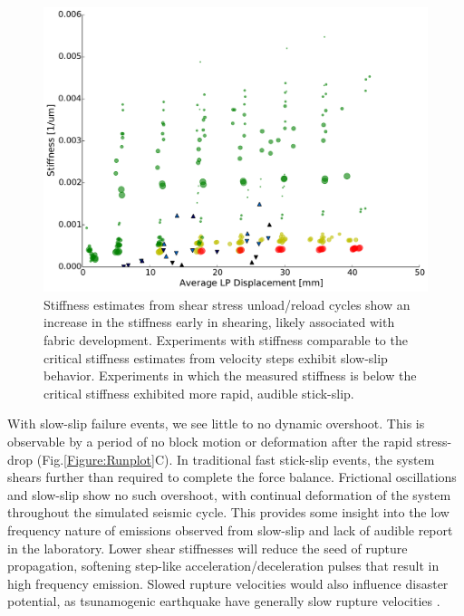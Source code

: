 \documentclass[11pt]{article}
\begin{document}
\begin{figure}
    \centering
        \includegraphics[scale=0.4]{../Figures/Fig_Stiffness_Evolution/Stiffness_Evolution.pdf}
       \caption{Stiffness estimates from shear stress unload/reload cycles show
       an increase in the stiffness early in shearing, likely associated with
       fabric development. Experiments with stiffness comparable to the critical stiffness
       estimates from velocity steps exhibit slow-slip behavior. Experiments in
       which the measured stiffness is below the critical stiffness exhibited
       more rapid, audible stick-slip.}
      \label{Figure:Stiffness Evolution}
\end{figure}

With slow-slip failure events, we see little to no dynamic overshoot. This is observable by a period of no block motion or
deformation after the rapid stress-drop (Fig.\ref{Figure:Runplot}C).  In
traditional fast stick-slip events, the system shears further than required to
complete the force balance. Frictional oscillations and slow-slip
show no such overshoot, with continual deformation of the system throughout the
simulated seismic cycle. This provides some insight into the low frequency
nature of emissions observed from slow-slip and lack of audible report in the
laboratory. Lower shear stiffnesses will reduce the seed of rupture propagation,
softening step-like acceleration/deceleration pulses that result in high
frequency emission. Slowed rupture velocities would also influence disaster potential, as
tsunamogenic earthquake have generally slow rupture velocities
\cite{Kanamori:1993, Bilek:1999}.
\end{document}
